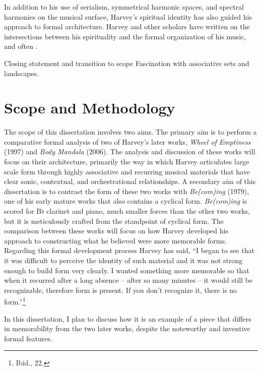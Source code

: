 \doublespacing

In addition to his use of serialism, symmetrical harmonic spaces, and spectral harmonies on the musical surface, Harvey's spiritual identity has also guided his approach to formal architecture. Harvey and other scholars have written on the intersections between his spirituality and the formal organization of his music, and often .

Closing statement and transition to scope Fascination with associative sets and landscapes.

\section{Scope and Methodology}\label{scope-and-methodology}

The scope of this dissertation involves two aims. The primary aim is to perform a comparative formal analysis of two of Harvey's later works, \emph{Wheel of Emptiness} (1997) and \emph{Body Mandala} (2006). The analysis and discussion of these works will focus on their architecture, primarily the way in which Harvey articulates large scale form through highly associative and recurring musical materials that have clear sonic, contextual, and orchestrational relationships. A secondary aim of this dissertation is to contrast the form of these two works with \emph{Be(com)ing} (1979), one of his early mature works that also contains a cyclical form. \emph{Be(com)ing} is scored for B\(\flat\) clarinet and piano, much smaller forces than the other two works, but it is meticulously crafted from the standpoint of cyclical form. The comparison between these works will focus on how Harvey developed his approach to constructing what he believed were more memorable forms. Regarding this formal development process Harvey has said, ``I began to see that it was difficult to perceive the identity of such material and it was not strong enough to build form very clearly. I wanted something more memorable so that when it recurred after a long absence -- after so many minutes -- it would still be recognizable, therefore form is present. If you don't recognize it, there is no form.''\footnote{Ibid., 22. }

In this dissertation, I plan to discuss how it is an example of a piece that differs in memorability from the two later works, despite the noteworthy and inventive formal features.

